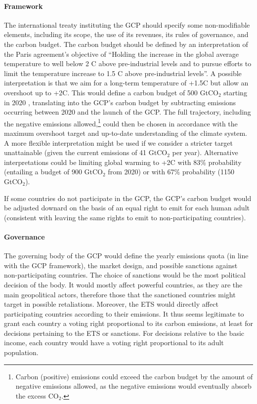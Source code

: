 \documentclass[12pt,english]{article}
\begin{document}
\paragraph{Framework} 
The international treaty instituting the GCP should specify some non-modifiable elements, including its scope, the use of its revenues, its rules of governance, and the carbon budget. The carbon budget should be defined by an interpretation of the Paris agreement's objective of 
``Holding the increase in the global average temperature to well below 2 \textdegree{}C above pre-industrial levels and to pursue efforts to limit the temperature increase to 1.5 \textdegree{}C above pre-industrial levels''. A possible interpretation is that we aim for a long-term temperature of +1.5\textdegree{}C but allow an overshoot up to +2\textdegree{}C. 
This would define a carbon budget of 500 GtCO$_\text{2}$ starting in 2020 \citep{ipcc_climate_2021}, translating into the GCP's carbon budget by subtracting emissions occurring between 2020 and the launch of the GCP. The full trajectory, including the negative emissions allowed,\footnote{Carbon (positive) emissions could exceed the carbon budget by the amount of negative emissions allowed, as the negative emissions would eventually absorb the excess CO$_\text{2}$.} could then be chosen in accordance with the maximum overshoot target and up-to-date understanding of the climate system. A more flexible interpretation might be used if we consider a stricter target unattainable (given the current emissions of 41 GtCO$_\text{2}$ per year). Alternative interpretations could be limiting global warming to +2\textdegree{}C with 83\% probability (entailing a budget of 900 GtCO$_\text{2}$ from 2020) or with 67\% probability (1150 GtCO$_\text{2}$). %

If some countries do not participate in the GCP, the GCP's carbon budget would be adjusted downard on the basis of an equal right to emit for each human adult (consistent with leaving the same rights to emit to non-participating countries).

\paragraph{Governance} 
The governing body of the GCP would define the yearly emissions quota (in line with the GCP framework), the market design, and possible sanctions against non-participating countries. The choice of sanctions would be the most political decision of the body. It would mostly affect powerful countries, as they are the main geopolitical actors, therefore those that the sanctioned countries might target in possible retaliations. Moreover, the ETS would directly affect participating countries according to their emissions. It thus seems legitimate to grant each country a voting right proportional to its carbon emissions, at least for decisions pertaining to the ETS or sanctions. For decisions relative to the basic income, each country would have a voting right proportional to its adult population. 
\end{document}
